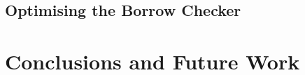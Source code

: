\documentclass[11pt,a4paper,twoside,openany]{report}
\newcommand{\fixme}[1] {{\color{red}#1}}
\begin{document}

\section{Optimising the Borrow Checker}\label{sec:optim-borr-check}



\chapter{Conclusions and Future Work}\label{cha:conclusions}


\printbibliography[heading=bibintoc]
\end{document}
